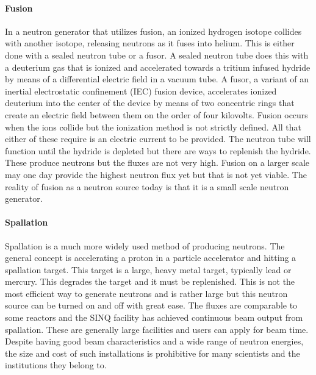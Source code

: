 \paragraph{Fusion}
In a neutron generator that utilizes fusion, an ionized hydrogen isotope collides with another isotope, releasing neutrons as it fuses into helium. This is either done with a sealed neutron tube or a fusor. A sealed neutron tube does this with a deuterium gas that is ionized and accelerated towards a tritium infused hydride by means of a differential electric field in a vacuum tube. A fusor, a variant of an inertial electrostatic confinement (IEC) fusion device, accelerates ionized deuterium into the center of the device by means of two concentric rings that create an electric field between them on the order of four kilovolts. Fusion occurs when the ions collide but the ionization method is not strictly defined. All that either of these require is an electric current to be provided. The neutron tube will function until the hydride is depleted but there are ways to replenish the hydride. These produce neutrons but the fluxes are not very high. Fusion on a larger scale may one day provide the highest neutron flux yet but that is not yet viable. The reality of fusion as a neutron source today is that it is a small scale neutron generator.

\paragraph{Spallation}
Spallation is a much more widely used method of producing neutrons. The general concept is accelerating a proton in a particle accelerator and hitting a spallation target. This target is a large, heavy metal target, typically lead or mercury. This degrades the target and it must be replenished. This is not the most efficient way to generate neutrons and is rather large but this neutron source can be turned on and off with great ease. The fluxes are comparable to some reactors and the SINQ facility has achieved continuous beam output from spallation. These are generally large facilities and users can apply for beam time. Despite having good beam characteristics and a wide range of neutron energies, the size and cost of such installations is prohibitive for many scientists and the institutions they belong to.

